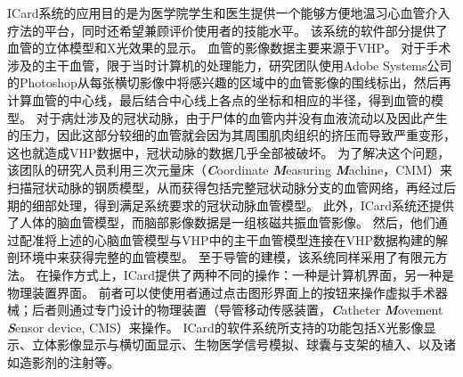 ICard系统的应用目的是为医学院学生和医生提供一个能够方便地温习心血管介入疗法的平台，同时还希望兼顾评价使用者的技能水平。
该系统的软件部分提供了血管的立体模型和X光效果的显示\cite{Wang1998ICard}\cite{Wang1998aICard}。
血管的影像数据主要来源于VHP。
对于手术涉及的主干血管，限于当时计算机的处理能力，研究团队使用Adobe Systems公司的Photoshop从每张横切影像中将感兴趣的区域中的血管影像的围线标出，然后再计算血管的中心线，最后结合中心线上各点的坐标和相应的半径，得到血管的模型\cite{Wang1998ICard}。
对于病灶涉及的冠状动脉，由于尸体的血管内并没有血液流动以及因此产生的压力，因此这部分较细的血管就会因为其周围肌肉组织的挤压而导致严重变形，这也就造成VHP数据中，冠状动脉的数据几乎全部被破坏\cite{Wang1998ICard}。
为了解决这个问题，该团队的研究人员利用三次元量床（\textbf{\textit{C}}oordinate \textbf{\textit{M}}easuring \textbf{\textit{M}}achine，CMM）\cite{CMMweb}来扫描冠状动脉的钢质模型\cite{KyotoModelweb}，从而获得包括完整冠状动脉分支的血管网络，再经过后期的细部处理，得到满足系统要求的冠状动脉血管模型\cite{Wang1998ICard}。
此外，ICard系统还提供了人体的脑血管模型\cite{Serra1997Vessel}\cite{Poston1995Vessel}，而脑部影像数据是一组核磁共振血管影像\cite{Wang1998ICard}。
然后，他们通过配准将上述的心脑血管模型与VHP中的主干血管模型连接在VHP数据构建的解剖环境中来获得完整的血管模型\cite{Wang1998ICard}。
至于导管的建模，该系统同样采用了有限元方法\cite{Wang1998ICard}。
在操作方式上，ICard提供了两种不同的操作：一种是计算机界面，另一种是物理装置界面\cite{Wang1998ICard}。
前者可以使使用者通过点击图形界面上的按钮来操作虚拟手术器械；后者则通过专门设计的物理装置（导管移动传感装置，\textbf{\textit{C}}atheter \textbf{\textit{M}}ovement \textbf{\textit{S}}ensor device, CMS）来操作\cite{Lim1998ICard}\cite{Lim1997ICard}。
ICard的软件系统所支持的功能包括X光影像显示、立体影像显示与横切面显示、生物医学信号模拟、球囊与支架的植入、以及诸如造影剂的注射等\cite{Wang1998ICard}。

